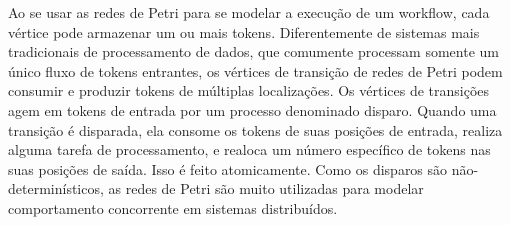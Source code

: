 		Ao se usar as redes de Petri para se modelar a execução de um workflow, cada
vértice pode armazenar um ou mais tokens. Diferentemente de sistemas mais
tradicionais de processamento de dados, que comumente processam somente um único
fluxo de tokens entrantes, os vértices de transição de redes de Petri podem consumir e
produzir tokens de múltiplas localizações. Os vértices de transições agem em tokens de
entrada por um processo denominado disparo. Quando uma transição é disparada, ela
consome os tokens de suas posições de entrada, realiza alguma tarefa de processamento,
e realoca um número específico de tokens nas suas posições de saída. Isso é feito
atomicamente. Como os disparos são não-determinísticos, as redes de Petri são muito
utilizadas para modelar comportamento concorrente em sistemas distribuídos.

